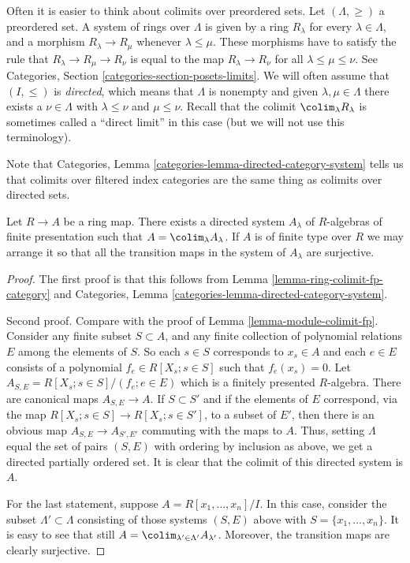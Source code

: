 \noindent
Often it is easier to think about colimits over preordered sets.
Let $(\Lambda, \geq)$ a preordered set.
A system of rings over $\Lambda$ is given by
a ring $R_\lambda$ for every $\lambda \in \Lambda$,
and a morphism $R_\lambda \to R_\mu$ whenever $\lambda \leq \mu$.
These morphisms have to satisfy the rule that
$R_\lambda \to R_\mu \to R_\nu$ is equal to the map
$R_\lambda \to R_\nu$ for all $\lambda \leq \mu \leq \nu$.
See Categories, Section \ref{categories-section-posets-limits}.
We will often assume that $(I, \leq)$ is {\it directed},
which means that $\Lambda$ is nonempty and
given $\lambda, \mu \in \Lambda$
there exists a $\nu \in \Lambda$ with $\lambda \leq \nu$ and $\mu \leq \nu$.
Recall that the colimit $\colim_\lambda R_\lambda$
is sometimes called a ``direct limit'' in this case
(but we will not use this terminology).

\medskip\noindent
Note that Categories, Lemma \ref{categories-lemma-directed-category-system}
tells us that colimits over filtered index categories are the same
thing as colimits over directed sets.

\begin{lemma}
\label{lemma-ring-colimit-fp}
Let $R \to A$ be a ring map. There exists a directed system $A_\lambda$ of
$R$-algebras of finite presentation such that $A = \colim_\lambda A_\lambda$.
If $A$ is of finite type over $R$ we may arrange it so that all the
transition maps in the system of $A_\lambda$ are surjective.
\end{lemma}

\begin{proof}
The first proof is that this follows from
Lemma \ref{lemma-ring-colimit-fp-category} and
Categories, Lemma \ref{categories-lemma-directed-category-system}.

\medskip\noindent
Second proof.
Compare with the proof of Lemma \ref{lemma-module-colimit-fp}.
Consider any finite subset $S \subset A$, and any finite
collection of polynomial relations $E$ among the elements of $S$.
So each $s \in S$ corresponds to $x_s \in A$ and
each $e \in E$ consists of a polynomial
$f_e \in R[X_s; s\in S]$ such that $f_e(x_s) = 0$.
Let $A_{S, E} = R[X_s; s\in S]/(f_e; e\in E)$
which is a finitely presented $R$-algebra.
There are canonical maps $A_{S, E} \to A$.
If $S \subset S'$ and if the elements of
$E$ correspond, via the map $R[X_s; s \in S] \to R[X_s; s\in S']$,
to a subset of $E'$, then there is an obvious map
$A_{S, E} \to A_{S', E'}$ commuting with the
maps to $A$. Thus, setting $\Lambda$ equal the set of pairs
$(S, E)$ with ordering by inclusion as above, we get a
directed partially ordered set.
It is clear that the colimit of this directed system is $A$.

\medskip\noindent
For the last statement, suppose $A = R[x_1, \ldots, x_n]/I$.
In this case, consider the subset $\Lambda' \subset \Lambda$
consisting of those systems $(S, E)$ above
with $S = \{x_1, \ldots, x_n\}$. It is easy to see that
still $A = \colim_{\lambda' \in \Lambda'} A_{\lambda'}$.
Moreover, the transition maps are clearly surjective.
\end{proof}

